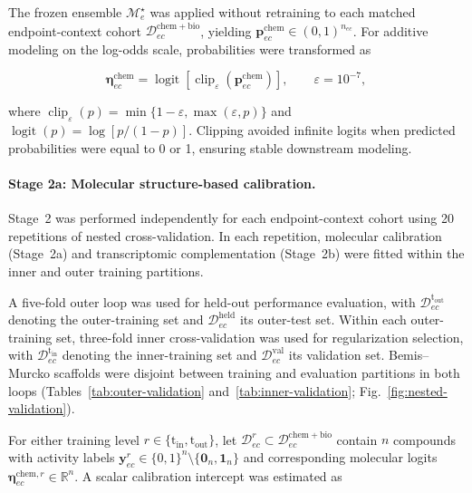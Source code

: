 \documentclass[11pt,a4paper]{article}
\begin{document}
The frozen ensemble $\mathcal M_e^\star$ was applied without retraining to
each matched endpoint-context cohort
$\mathcal D^{\mathrm{chem+bio}}_{ec}$, yielding
$\mathbf p^{\mathrm{chem}}_{ec}\in(0,1)^{n_{ec}}$.
For additive modeling on the log-odds scale, probabilities were transformed as

\begin{equation}
\boldsymbol\eta^{\mathrm{chem}}_{ec}
=
\operatorname{logit}
\!\left[
\operatorname{clip}_{\varepsilon}
\!\left(
\mathbf p^{\mathrm{chem}}_{ec}
\right)
\right],
\qquad
\varepsilon=10^{-7},
\label{eq:mol-logit}
\end{equation}

where
$\operatorname{clip}_{\varepsilon}(p)
=\min\{1-\varepsilon,\max(\varepsilon,p)\}$
and
$\operatorname{logit}(p)=\log[p/(1-p)]$.
Clipping avoided infinite logits when predicted probabilities were equal to 0 or 1, ensuring stable downstream modeling.

\paragraph{Stage 2a: Molecular structure-based calibration.}

Stage~2 was performed independently for each endpoint-context cohort using
20 repetitions of nested cross-validation. In each repetition, molecular
calibration (Stage~2a) and transcriptomic complementation (Stage~2b) were fitted within the inner and outer training partitions.

A five-fold outer loop was used for held-out performance evaluation, with
$\mathcal D_{ec}^{\mathrm{t}_{\mathrm{out}}}$ denoting the outer-training
set and $\mathcal D_{ec}^{\mathrm{held}}$ its outer-test set. Within each
outer-training set, three-fold inner cross-validation was used for
regularization selection, with
$\mathcal D_{ec}^{\mathrm{t}_{\mathrm{in}}}$ denoting the inner-training
set and $\mathcal D_{ec}^{\mathrm{val}}$ its validation set.
Bemis--Murcko scaffolds were disjoint between training and evaluation
partitions in both loops
(Tables~\ref{tab:outer-validation} and~\ref{tab:inner-validation};
Fig.~\ref{fig:nested-validation}).

For either training level
$r\in\{\mathrm{t}_{\mathrm{in}},\mathrm{t}_{\mathrm{out}}\}$, let
$\mathcal D_{ec}^{r}\subset\mathcal D^{\mathrm{chem+bio}}_{ec}$ contain
$n$ compounds with activity labels
$\mathbf y_{ec}^{r}\in\{0,1\}^{n}\setminus
\{\mathbf 0_n,\mathbf 1_n\}$ and corresponding molecular logits
$\boldsymbol\eta_{ec}^{\mathrm{chem},r}\in\mathbb R^n$.
A scalar calibration intercept was estimated as
\end{document}
